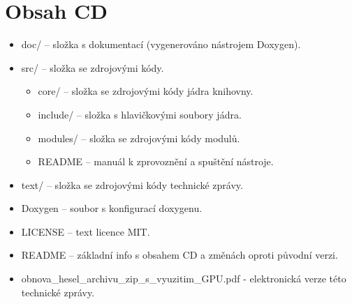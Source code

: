 \chapter{Obsah CD}
\begin{itemize}
    \item doc/ -- složka s dokumentací (vygenerováno nástrojem Doxygen).
    \item src/ -- složka se zdrojovými kódy.
	\begin{itemize}
	    \item core/ -- složka se zdrojovými kódy jádra knihovny.
	    \item include/ -- složka s hlavičkovými soubory jádra.
	    \item modules/ -- složka se zdrojovými kódy modulů.
	    \item README -- manuál k zprovoznění a spuštění nástroje.
	\end{itemize}
    \item text/ -- složka se zdrojovými kódy technické zprávy.
    \item Doxygen -- soubor s konfigurací doxygenu.
    \item LICENSE -- text licence MIT.
    \item README -- základní info s obsahem CD a změnách oproti původní verzi.
    \item obnova\_hesel\_archivu\_zip\_s\_vyuzitim\_GPU.pdf - elektronická verze této technické zprávy.
\end{itemize}
